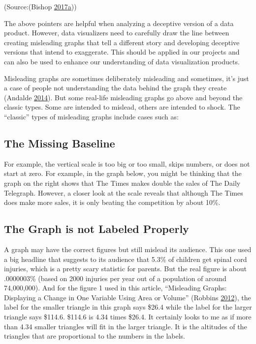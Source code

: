 \documentclass[]{book}
\theoremstyle{definition}
\theoremstyle{definition}
\theoremstyle{definition}
\theoremstyle{remark}
\begin{document}
(Source:(Bishop
\protect\hyperlink{ref-visual-lies}{2017}\protect\hyperlink{ref-visual-lies}{a}))

The above pointers are helpful when analyzing a deceptive version of a
data product. However, data visualizers need to carefully draw the line
between creating misleading graphs that tell a different story and
developing deceptive versions that intend to exaggerate. This should be
applied in our projects and can also be used to enhance our
understanding of data visualization products.

Misleading graphs are sometimes deliberately misleading and sometimes,
it's just a case of people not understanding the data behind the graph
they create (Andalde \protect\hyperlink{ref-andale_2014}{2014}). But
some real-life misleading graphs go above and beyond the classic types.
Some are intended to mislead, others are intended to shock. The
``classic'' types of misleading graphs include cases such as:

\subsection{The Missing Baseline}\label{the-missing-baseline}

For example, the vertical scale is too big or too small, skips numbers,
or does not start at zero. For example, in the graph below, you might be
thinking that the graph on the right shows that The Times makes double
the sales of The Daily Telegraph. However, a closer look at the scale
reveals that although The Times does make more sales, it is only beating
the competition by about 10\%.

\subsection{The Graph is not Labeled
Properly}\label{the-graph-is-not-labeled-properly}

A graph may have the correct figures but still mislead its audience.
This one used a big headline that suggests to its audience that 5.3\% of
children get spinal cord injuries, which is a pretty scary statistic for
parents. But the real figure is about .0000003\% (based on 2000 injuries
per year out of a population of around 74,000,000). And for the figure 1
used in this article, ``Misleading Graphs: Displaying a Change in One
Variable Using Area or Volume'' (Robbins
\protect\hyperlink{ref-scaling_issues}{2012}), the label for the smaller
triangle in this graph says \$26.4 while the label for the larger
triangle says \$114.6. \$114.6 is 4.34 times \$26.4. It certainly looks
to me as if more than 4.34 smaller triangles will fit in the larger
triangle. It is the altitudes of the triangles that are proportional to
the numbers in the labels.
\end{document}
